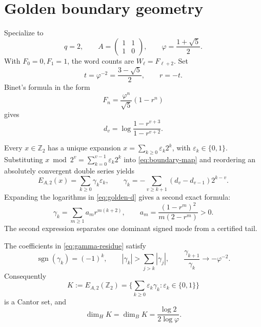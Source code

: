 \section{Golden boundary geometry}
\label{sec:golden}

Specialize to
\[
  q=2,\qquad
  A=\begin{pmatrix}1&1\\[1mm]1&0\end{pmatrix},
  \qquad
  \varphi=\frac{1+\sqrt5}{2}.
\]
With \(F_0=0,F_1=1\), the word counts are \(W_\ell=F_{\ell+2}\).
Set
\[
  t=\varphi^{-2}=\frac{3-\sqrt5}{2},\qquad r=-t.
\]
Binet's formula in the form
\[
  F_n=\frac{\varphi^n}{\sqrt5}(1-r^n)
\]
gives
\begin{equation}
  d_v=\log\frac{1-r^{v+3}}{1-r^{v+2}}.
  \label{eq:golden-d}
\end{equation}

Every \(x\in\mathbb Z_2\) has a unique expansion
\(x=\sum_{k\ge0}\varepsilon_k2^k\), with
\(\varepsilon_k\in\{0,1\}\).  Substituting
\(x\bmod2^v=\sum_{k=0}^{v-1}\varepsilon_k2^k\) into
\eqref{eq:boundary-map} and reordering an absolutely convergent double
series yields
\begin{equation}
  E_{A,2}(x)=\sum_{k\ge0}\gamma_k\varepsilon_k,\qquad
  \gamma_k=-\sum_{v\ge k+1}(d_v-d_{v-1})2^{k-v}.
  \label{eq:gamma-residue}
\end{equation}
Expanding the logarithms in \eqref{eq:golden-d} gives a second exact formula:
\begin{equation}
  \gamma_k=\sum_{m\ge1}a_m r^{m(k+2)},\qquad
  a_m=\frac{(1-r^m)^2}{m(2-r^m)}>0.
  \label{eq:gamma-modes}
\end{equation}
The second expression separates one dominant signed mode from a certified
tail.

\begin{theorem}
\label{thm:golden}
The coefficients in \eqref{eq:gamma-residue} satisfy
\[
  \operatorname{sgn}(\gamma_k)=(-1)^k,\qquad
  |\gamma_k|>\sum_{j>k}|\gamma_j|,\qquad
  \frac{\gamma_{k+1}}{\gamma_k}\longrightarrow-\varphi^{-2}.
\]
Consequently
\[
  K:=E_{A,2}(\mathbb Z_2)
  =\{\sum_{k\ge0}\varepsilon_k\gamma_k:
          \varepsilon_k\in\{0,1\}\}
\]
is a Cantor set, and
\[
  \dim_HK=\dim_BK=\frac{\log2}{2\log\varphi}.
\]
\end{theorem}

